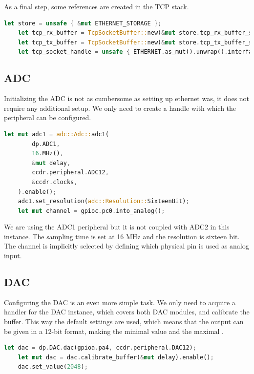 As a final step, some references are created in the TCP stack.

\begin{lstlisting}[language=Rust,frame=single,float=!ht,style=customrust,label={lst:tcp-init},caption={Creating References for TCP Objects}]
    let store = unsafe { &mut ETHERNET_STORAGE };
    let tcp_rx_buffer = TcpSocketBuffer::new(&mut store.tcp_rx_buffer_storage[..]);
    let tcp_tx_buffer = TcpSocketBuffer::new(&mut store.tcp_tx_buffer_storage[..]);
    let tcp_socket_handle = unsafe { ETHERNET.as_mut().unwrap().interface.add_socket(TcpSocket::new(tcp_rx_buffer, tcp_tx_buffer)) };
\end{lstlisting}

\subsection{ADC}

Initializing the ADC is not as cumbersome as setting up ethernet was, it does not require any additional setup. We only need to create a handle with which the peripheral can be configured.

\begin{lstlisting}[language=Rust,frame=single,float=!ht,style=customrust,label={lst:adc-init},caption={Initialization of the ADC}]
    let mut adc1 = adc::Adc::adc1(
        dp.ADC1,
        16.MHz(),
        &mut delay,
        ccdr.peripheral.ADC12,
        &ccdr.clocks,
    ).enable();
    adc1.set_resolution(adc::Resolution::SixteenBit);
    let mut channel = gpioc.pc0.into_analog();
\end{lstlisting}

We are using the ADC1 peripheral but it is not coupled with ADC2 in this instance. The sampling time is set at 16 MHz and the resolution is sixteen bit. The channel is implicitly selected by defining which physical pin is used as analog input.

\subsection{DAC}

Configuring the DAC is an even more simple task. We only need to acquire a handler for the DAC instance, which covers both DAC modules, and calibrate the buffer. This way the default settings are used, which means that the output can be given in a 12-bit format, making the minimal value  and the maximal .

\begin{lstlisting}[language=Rust,frame=single,float=!ht,style=customrust,label={lst:dac-init},caption={Initialization of the DAC}]
    let dac = dp.DAC.dac(gpioa.pa4, ccdr.peripheral.DAC12);
    let mut dac = dac.calibrate_buffer(&mut delay).enable();
    dac.set_value(2048);
\end{lstlisting}

